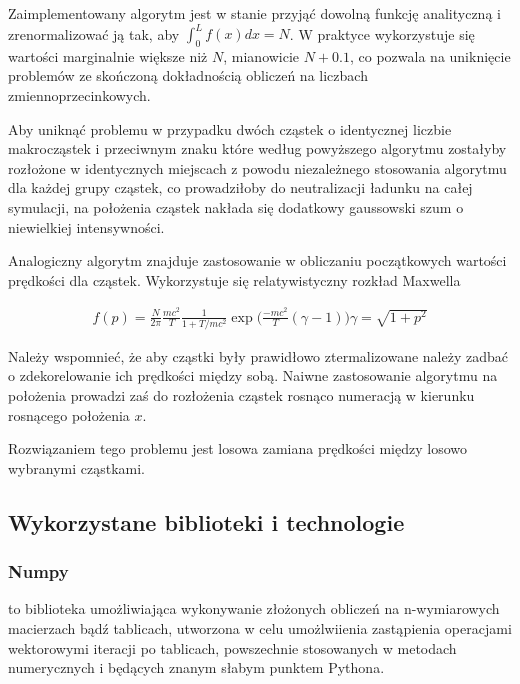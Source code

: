 
    Zaimplementowany algorytm jest w stanie przyjąć dowolną funkcję analityczną %
    i zrenormalizować ją tak, aby $\int_0^L f(x) dx = N$. W praktyce wykorzystuje się wartości marginalnie większe
    niż $N$, mianowicie $N+0.1$, co pozwala na uniknięcie problemów ze skończoną dokładnością obliczeń
    na liczbach zmiennoprzecinkowych.

    Aby uniknąć problemu w przypadku dwóch  cząstek o identycznej liczbie makrocząstek i przeciwnym znaku
    które według powyższego algorytmu zostałyby rozłożone w identycznych miejscach z powodu niezależnego
    stosowania algorytmu dla każdej grupy cząstek, co prowadziłoby do neutralizacji ładunku na całej symulacji,
    na położenia cząstek nakłada się dodatkowy gaussowski szum o niewielkiej intensywności.

    Analogiczny algorytm znajduje zastosowanie w obliczaniu początkowych wartości prędkości dla cząstek.
    Wykorzystuje się relatywistyczny rozkład Maxwella

    \begin{align}
        f(p) = \frac{N}{2 \pi} \frac{mc^2}{T} \frac{1}{1+T/mc^2} \exp \Big (\frac{-mc^2}{T}(\gamma -1) \Big)
        \gamma = \sqrt{1+p^2}
        \label{relativistic-maxwell-distribution}
    \end{align}

    Należy wspomnieć, że aby cząstki były prawidłowo ztermalizowane %
    należy zadbać o zdekorelowanie ich prędkości między sobą. Naiwne zastosowanie algorytmu na położenia
    prowadzi zaś do rozłożenia cząstek rosnąco numeracją w kierunku rosnącego położenia $x$.

    Rozwiązaniem tego problemu jest losowa zamiana prędkości między losowo wybranymi cząstkami.

    \subsection{Wykorzystane biblioteki i technologie}

    \subsubsection{Numpy}
     to biblioteka umożliwiająca wykonywanie złożonych obliczeń na n-wymiarowych macierzach
    bądź tablicach, utworzona w celu umożlwiienia zastąpienia operacjami wektorowymi iteracji po tablicach,
    powszechnie stosowanych w metodach numerycznych i będących znanym słabym punktem Pythona.

